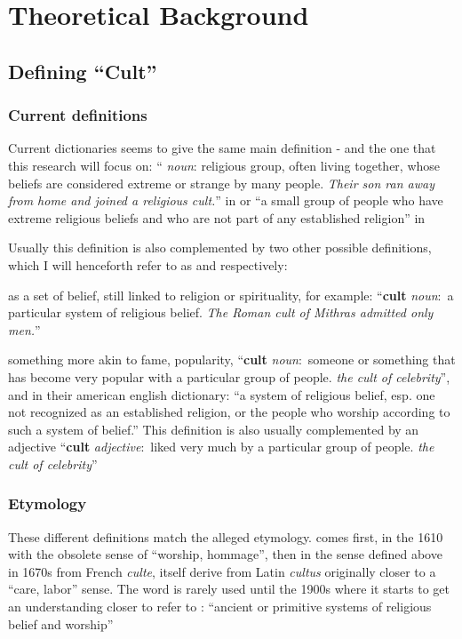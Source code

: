 \chapter{Theoretical Background}\label{ch:theory}
\section{Defining ``Cult''}\label{sec:defining_cult}
\subsection{Current definitions}\label{subsec:current_definitions}
Current dictionaries seems to give the same main definition - and the one that this research will focus on: \enquote{\textbf{\cultbelief{}} \textit{noun}: religious group, often living together, whose beliefs are considered extreme or strange by many people. 
\textit{Their son ran away from home and joined a religious cult.}} in \autocite{Cult2026CambridgeDefinition} or \enquote{a small group of people who have extreme religious beliefs and who are not part of any established religion} in \autocite{CultNounDefinitionOxford}

Usually this definition is also complemented by two other possible definitions, which I will henceforth refer to as \cultworship{} and \cultfame{} respectively:

\textbf{\cultworship{}} as a set of belief, still linked to religion or spirituality, for example: \enquote{\textbf{cult} \textit{noun}:\ a particular system of religious belief. \textit{The Roman cult of Mithras admitted only men.}}

\textbf{\cultfame{}} something more akin to fame, popularity, \enquote{\textbf{cult} \textit{noun}:\ someone or something that has become very popular with a particular group of people. \textit{the cult of celebrity}}, and in their american english dictionary: \enquote{a system of religious belief, esp. one not recognized as an established religion, or the people who worship according to such a system of belief.} This definition is also usually complemented by an adjective \enquote{\textbf{cult} \textit{adjective}:\ liked very much by a particular group of people. \textit{the cult of celebrity}}

\subsection{Etymology}
These different definitions match the alleged etymology. 
\cultworship comes first, in the 1610 with the obsolete sense of ``worship, hommage'', then in the sense defined above in 1670s from French \textit{culte}, itself derive from Latin \textit{cultus} originally closer to a ``care, labor'' sense.  The word is rarely used until the 1900s where it starts to get an understanding closer to refer to \cultbelief: \enquote{ancient or primitive systems of religious belief and worship}\autocite{CultEtymonline}

